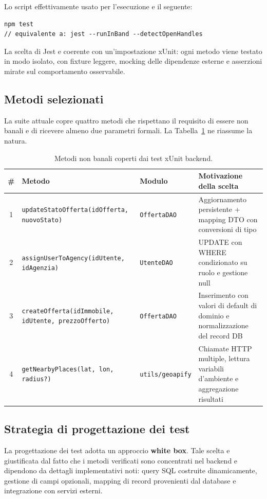 \documentclass[a4paper,11pt]{article}
\begin{document}
Lo script effettivamente usato per l'esecuzione e il seguente:

\begin{lstlisting}[style=projectcode]
npm test
// equivalente a: jest --runInBand --detectOpenHandles
\end{lstlisting}

La scelta di Jest e coerente con un'impostazione xUnit: ogni metodo viene testato in modo isolato, con fixture leggere, mocking delle dipendenze esterne e asserzioni mirate sul comportamento osservabile.

\subsection{Metodi selezionati}
La suite attuale copre quattro metodi che rispettano il requisito di essere non banali e di ricevere almeno due parametri formali. La Tabella~\ref{tab:metodi} ne riassume la natura.

\begin{table}[H]
\centering
\begin{tabularx}{\textwidth}{@{}c l l X@{}}
\toprule
\# & Metodo & Modulo & Motivazione della scelta \\
\midrule
1 & \texttt{updateStatoOfferta(idOfferta, nuovoStato)} & \texttt{OffertaDAO} & Aggiornamento persistente + mapping DTO con conversioni di tipo \\
2 & \texttt{assignUserToAgency(idUtente, idAgenzia)} & \texttt{UtenteDAO} & UPDATE con WHERE condizionato su ruolo e gestione null \\
3 & \texttt{createOfferta(idImmobile, idUtente, prezzoOfferto)} & \texttt{OffertaDAO} & Inserimento con valori di default di dominio e normalizzazione del record DB \\
4 & \texttt{getNearbyPlaces(lat, lon, radius?)} & \texttt{utils/geoapify} & Chiamate HTTP multiple, lettura variabili d'ambiente e aggregazione risultati \\
\bottomrule
\end{tabularx}
\caption{Metodi non banali coperti dai test xUnit backend.}
\label{tab:metodi}
\end{table}

\subsection{Strategia di progettazione dei test}
La progettazione dei test adotta un approccio \textbf{white box}. Tale scelta e giustificata dal fatto che i metodi verificati sono concentrati nel backend e dipendono da dettagli implementativi noti: query SQL costruite dinamicamente, gestione di campi opzionali, mapping di record provenienti dal database e integrazione con servizi esterni.
\end{document}
